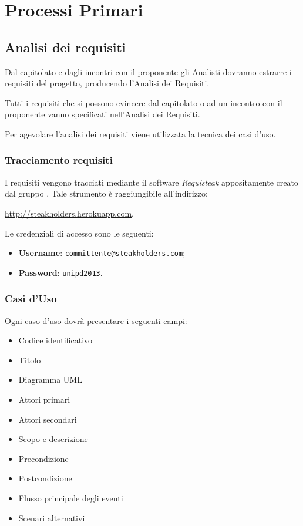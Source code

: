 \section{Processi Primari}
\subsection{Analisi dei requisiti}

Dal capitolato e dagli incontri con il proponente gli Analisti dovranno estrarre i requisiti del progetto, producendo l'Analisi dei Requisiti.

Tutti i requisiti che si possono evincere dal capitolato o ad un incontro con il proponente vanno specificati nell'Analisi dei Requisiti.

Per agevolare l'analisi dei requisiti viene utilizzata la tecnica dei casi d'uso.

    \subsubsection{Tracciamento requisiti}
     I requisiti vengono tracciati mediante il software \emph{Requisteak} appositamente creato dal gruppo \GroupName{}. Tale strumento è raggiungibile all'indirizzo:
     \begin{center}
         \url{http://steakholders.herokuapp.com}.
     \end{center} 
     Le credenziali di accesso sono le seguenti:
     \begin{itemize}
        \item \textbf{Username}: \texttt{committente@steakholders.com};
        \item \textbf{Password}: \texttt{unipd2013}.
     \end{itemize}
     
\subsubsection{Casi d'Uso}

Ogni caso d'uso dovrà presentare i seguenti campi:
\begin{itemize}
 \item Codice identificativo
 \item Titolo
 \item Diagramma UML
 \item Attori primari
 \item Attori secondari 
 \item Scopo e descrizione
 \item Precondizione
 \item Postcondizione
 \item Flusso principale degli eventi
 \item Scenari alternativi
\end{itemize}

